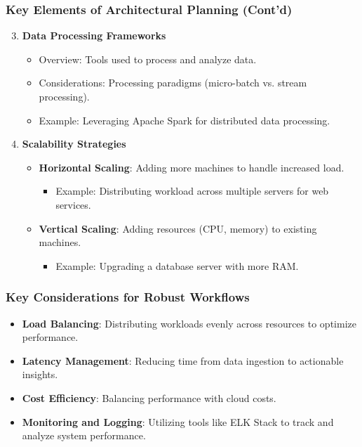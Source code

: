 \documentclass[aspectratio=169]{beamer}
\begin{document}
\begin{frame}[fragile]
    \frametitle{Key Elements of Architectural Planning (Cont'd)}
    \begin{enumerate}
        \setcounter{enumi}{2} %
        \item \textbf{Data Processing Frameworks}
            \begin{itemize}
                \item Overview: Tools used to process and analyze data.
                \item Considerations: Processing paradigms (micro-batch vs. stream processing).
                \item Example: Leveraging Apache Spark for distributed data processing.
            \end{itemize}

        \item \textbf{Scalability Strategies}
            \begin{itemize}
                \item \textbf{Horizontal Scaling}: Adding more machines to handle increased load.
                    \begin{itemize}
                        \item Example: Distributing workload across multiple servers for web services.
                    \end{itemize}
                \item \textbf{Vertical Scaling}: Adding resources (CPU, memory) to existing machines.
                    \begin{itemize}
                        \item Example: Upgrading a database server with more RAM.
                    \end{itemize}
            \end{itemize}
    \end{enumerate}
\end{frame}

\begin{frame}[fragile]
    \frametitle{Key Considerations for Robust Workflows}
    \begin{itemize}
        \item \textbf{Load Balancing}: Distributing workloads evenly across resources to optimize performance.
        \item \textbf{Latency Management}: Reducing time from data ingestion to actionable insights.
        \item \textbf{Cost Efficiency}: Balancing performance with cloud costs.
        \item \textbf{Monitoring and Logging}: Utilizing tools like ELK Stack to track and analyze system performance.
    \end{itemize}
\end{frame}
\end{document}
